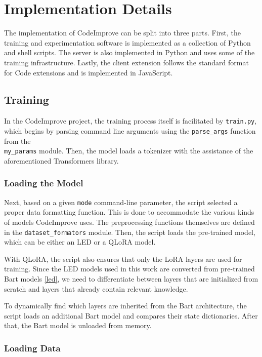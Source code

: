 \chapter{Implementation Details}
    The implementation of CodeImprove can be split into three parts. First, the training and experimentation software is implemented as a collection of Python and shell scripts. The server is also implemented in Python and uses some of the training infrastructure. Lastly, the client extension follows the standard format for Code extensions and is implemented in JavaScript.
    
    \section{Training}
    In the CodeImprove project, the training process itself is facilitated by \texttt{train.py}, which begins by parsing command line arguments using the \texttt{parse\_args} function from the \\ \texttt{my\_params} module. Then, the model loads a tokenizer with the assistance of the aforementioned Transformers library. 

    \subsection{Loading the Model}
    
        Next, based on a given \texttt{mode} command-line parameter, the script selected a proper data formatting function. This is done to accommodate the various kinds of models CodeImprove uses. The preprocessing functions themselves are defined in the \texttt{dataset\_formators} module. Then, the script loads the pre-trained model, which can be either an LED or a QLoRA model. 
        
        \medskip
        
        With QLoRA, the script also ensures that only the LoRA layers are used for training. Since the LED models used in this work are converted from pre-trained Bart models \ref{led}, we need to differentiate between layers that are initialized from scratch and layers that already contain relevant knowledge. 
        
        To dynamically find which layers are inherited from the Bart architecture, the script loads an additional Bart model and compares their state dictionaries. After that, the Bart model is unloaded from memory.
    
    \subsection{Loading Data}
    
